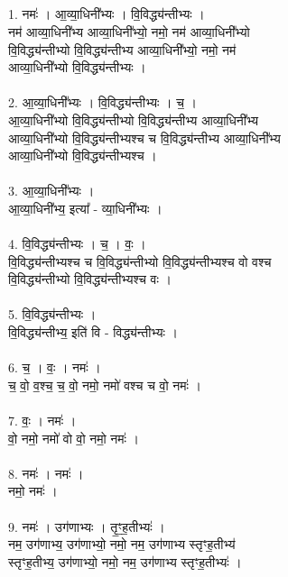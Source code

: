 \subsection{}
1. नमः॑ । आ॒व्या॒धिनी᳚भ्यः । वि॒विद्ध्य॑न्तीभ्यः ।\\
नम॑ आव्या॒धिनी᳚भ्य आव्या॒धिनी᳚भ्यो॒ नमो॒ नम॑ आव्या॒धिनी᳚भ्यो\\
वि॒विद्ध्य॑न्तीभ्यो वि॒विद्ध्य॑न्तीभ्य आव्या॒धिनी᳚भ्यो॒ नमो॒ नम॑\\
आव्या॒धिनी᳚भ्यो वि॒विद्ध्य॑न्तीभ्यः ।\\
\\
2. आ॒व्या॒धिनी᳚भ्यः । वि॒विद्ध्य॑न्तीभ्यः । च॒ ।\\
आ॒व्या॒धिनी᳚भ्यो वि॒विद्ध्य॑न्तीभ्यो वि॒विद्ध्य॑न्तीभ्य आव्या॒धिनी᳚भ्य\\
आव्या॒धिनी᳚भ्यो वि॒विद्ध्य॑न्तीभ्यश्च च वि॒विद्ध्य॑न्तीभ्य आव्या॒धिनी᳚भ्य\\
आव्या॒धिनी᳚भ्यो वि॒विद्ध्य॑न्तीभ्यश्च ।\\
\\
3. आ॒व्या॒धिनी᳚भ्यः ।\\
आ॒व्या॒धिनी᳚भ्य॒ इत्या᳚ - व्या॒धिनी᳚भ्यः ।\\
\\
4. वि॒विद्ध्य॑न्तीभ्यः । च॒ । वः॒ ।\\
वि॒विद्ध्य॑न्तीभ्यश्च च वि॒विद्ध्य॑न्तीभ्यो वि॒विद्ध्य॑न्तीभ्यश्च वो वश्च\\
वि॒विद्ध्य॑न्तीभ्यो वि॒विद्ध्य॑न्तीभ्यश्च वः ।\\
\\
5. वि॒विद्ध्य॑न्तीभ्यः ।\\
वि॒विद्ध्य॑न्तीभ्य॒ इति॑ वि - विद्ध्य॑न्तीभ्यः ।\\
\\
6. च॒ । वः॒ । नमः॑ ।\\
च॒ वो॒ व॒श्च॒ च॒ वो॒ नमो॒ नमो॑ वश्च च वो॒ नमः॑ ।\\
\\
7. वः॒ । नमः॑ ।\\
वो॒ नमो॒ नमो॑ वो वो॒ नमो॒ नमः॑ ।\\
\\
8. नमः॑ । नमः॑ ।\\
नमो॒ नमः॑ ।\\
\\
9. नमः॑ । उग॑णाभ्यः । तृ॒ꣳ॒ह॒तीभ्यः॑ ।\\
नम॒ उग॑णाभ्य॒ उग॑णाभ्यो॒ नमो॒ नम॒ उग॑णाभ्य स्तृꣳह॒तीभ्य॑\\
स्तृꣳह॒तीभ्य॒ उग॑णाभ्यो॒ नमो॒ नम॒ उग॑णाभ्य स्तृꣳह॒तीभ्यः॑ ।\\
\\
